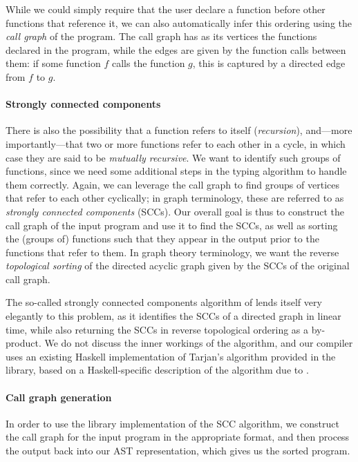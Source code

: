 While we could simply require that the user declare a function before other
functions that reference it, we can also automatically infer this ordering using
the \emph{call graph} of the program.
The call graph has as its vertices the functions declared in the program, while
the edges are given by the function calls between them: if some function $f$
calls the function $g$, this is captured by a directed edge from $f$ to $g$.

\paragraph{Strongly connected components}
There is also the possibility that a function refers to itself
(\emph{recursion}), and---more importantly---that two or more functions refer to
each other in a cycle, in which case they are said to be \emph{mutually
recursive}. We want to identify such groups of functions, since we need some
additional steps in the typing algorithm to handle them correctly.
Again, we can leverage the call graph to find groups of vertices that refer to
each other cyclically; in graph terminology, these are referred to as
\emph{strongly connected components} (SCCs).
Our overall goal is thus to construct the call graph of the input program and
use it to find the SCCs, as well as sorting the (groups of) functions such that
they appear in the output prior to the functions that refer to them.
In graph theory terminology, we want the reverse \emph{topological sorting} of
the directed acyclic graph given by the SCCs of the original call graph.

The so-called strongly connected components algorithm of \citet{Tarjan1972}
lends itself very elegantly to this problem, as it identifies the SCCs of a
directed graph in linear time, while also returning the SCCs in reverse
topological ordering as a by-product.
We do not discuss the inner workings of the algorithm, and our compiler uses an
existing Haskell implementation of Tarjan's algorithm provided in the
 library, based on a Haskell-specific description of
the algorithm due to \citet{King1995}.

\paragraph{Call graph generation}
In order to use the library implementation of the SCC algorithm, we construct
the call graph for the input program in the appropriate format, and then process
the output back into our AST representation, which gives us the sorted program.

